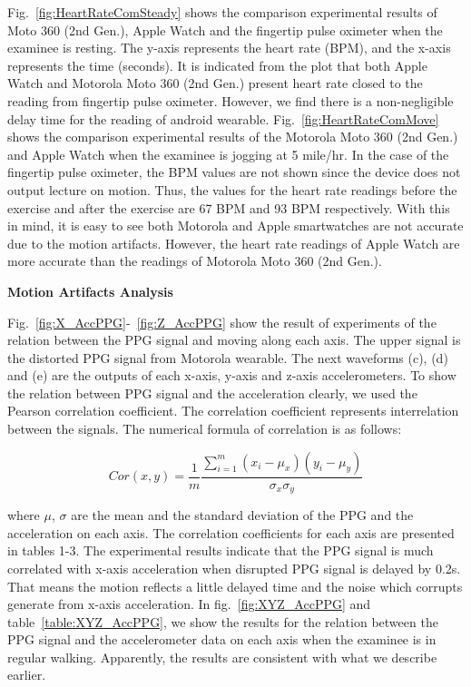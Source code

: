 \documentclass[11pt, draftclsnofoot, onecolumn]{IEEEtran}
\begin{document}
    Fig.~\ref{fig:HeartRateComSteady} shows the comparison experimental results of Moto 360 (2nd Gen.), Apple Watch and the fingertip pulse oximeter when the examinee is resting. The y-axis represents the heart rate (BPM), and the x-axis represents the time (seconds). It is indicated from the plot that both Apple Watch and Motorola Moto 360 (2nd Gen.) present heart rate closed to the reading from fingertip pulse oximeter. However, we find there is a non-negligible delay time for the reading of android wearable. Fig.~\ref{fig:HeartRateComMove} shows the comparison experimental results of the Motorola Moto 360 (2nd Gen.) and Apple Watch when the examinee is jogging at 5 mile/hr. In the case of the fingertip pulse oximeter, the BPM values are not shown since the device does not output lecture on motion. Thus, the values for the heart rate readings before the exercise and after the exercise are 67 BPM and 93 BPM respectively. With this in mind, it is easy to see both Motorola and Apple smartwatches are not accurate due to the motion artifacts. However, the heart rate readings of Apple Watch are more accurate than the readings of Motorola Moto 360 (2nd Gen.).

	\pagebreak
    \textbf{Motion Artifacts Analysis}
    
    Fig.~\ref{fig:X_AccPPG}-~\ref{fig:Z_AccPPG} show the result of experiments of the relation between the PPG signal and moving along each axis. The upper signal is the distorted PPG signal from Motorola wearable. The next waveforms (c), (d) and (e) are the outputs of each x-axis, y-axis and z-axis accelerometers. To show the relation between PPG signal and the acceleration clearly, we used the Pearson correlation coefficient. The correlation coefficient represents interrelation between the signals. The numerical formula of correlation is as follows:    
    
    \begin{equation}
    Cor(x,y)=\frac{1}{m}\frac{\sum\limits_{i=1}^{m}(x_i-\mu_x)(y_i-\mu_y)}{\sigma_x\sigma_y}
    \end{equation}

    
where $\mu$, $\sigma$ are the mean and the standard deviation of the PPG and the acceleration on each axis. The correlation coefficients for each axis are presented in tables 1-3. The experimental results indicate that the PPG signal is much correlated with x-axis acceleration when disrupted PPG signal is delayed by 0.2s. That means the motion reflects a little delayed time and the noise which corrupts generate from x-axis acceleration. In fig.~\ref{fig:XYZ_AccPPG} and table~\ref{table:XYZ_AccPPG}, we show the results for the relation between the PPG signal and the accelerometer data on each axis when the examinee is in regular walking. Apparently, the results are consistent with what we describe earlier.
    
\end{document}
